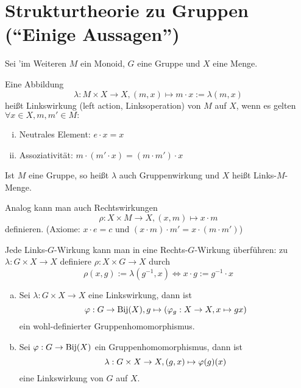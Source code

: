 \documentclass[a4paper]{report}
\begin{document}
\section{Strukturtheorie zu Gruppen (``Einige Aussagen'')}
Sei 'im Weiteren $M$ ein Monoid, $G$ eine Gruppe und $X$ eine Menge.
\begin{defi}
\label{def:Wirkung}
  Eine Abbildung
  $$\lambda : M \times X \to X, (m,x) \mapsto m \cdot x := \lambda(m,x)$$
  heißt Linkswirkung (left action, Linksoperation) von $M$ auf $X$, wenn es gelten $\forall x \in X, m, m' \in M:$
  \begin{enumerate}[(i)]
    \item Neutrales Element: $e\cdot x = x$
    \item Assoziativität: $m\cdot (m'\cdot x) = (m\cdot m') \cdot x$
  \end{enumerate}
\end{defi}
\begin{bez*}
  Ist $M$ eine Gruppe, so heißt $\lambda$ auch Gruppenwirkung und $X$ heißt Links-$M$-Menge.
\end{bez*}
\begin{bem*} Analog kann man auch Rechtswirkungen
  $$\rho : X \times M \to X, (x,m) \mapsto x \cdot m$$
  definieren. (Axiome: $x\cdot e = c$ und $(x\cdot m)\cdot m' = x \cdot (m \cdot m')$)
\end{bem*}
\begin{bem*}[Übung]
  Jede Links-$G$-Wirkung kann man in eine Rechts-$G$-Wirkung überführen:
  zu $\lambda: G \times X \to X$ definiere $\rho : X \times G \to X$ durch
  $$\rho(x,g) := \lambda(g^{-1}, x) \iff x \cdot g := g^{-1} \cdot x$$
\end{bem*}
\begin{prop} \item
\begin{enumerate}[(a)]
  \item Sei $\lambda: G \times X \to X$ eine Linkswirkung, dann ist
        $$\varphi : G \to \operatorname{Bij}(X), g \mapsto (\varphi_{g}: X \to X, x \mapsto gx)$$
        ein wohl-definierter Gruppenhomomorphismus.
  \item Sei $\varphi : G \to \operatorname{Bij}(X)$ ein Gruppenhomomorphismus, dann ist
        $$\lambda: G \times X \to X, (g,x) \mapsto \varphi(g)(x)$$
        eine Linkswirkung von $G$ auf $X$.
\end{enumerate}
\end{prop}
\end{document}
